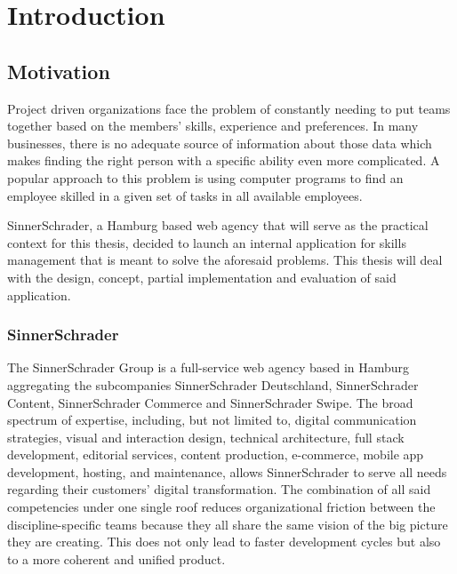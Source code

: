 \chapter{Introduction}

\section{Motivation}
Project driven organizations face the problem of constantly needing to put teams together based on the members’ skills, experience and preferences.
In many businesses, there is no adequate source of information about those data which makes finding the right person with a specific ability even more complicated. A popular approach to this problem is using computer programs to find an employee skilled in a given set of tasks in all available employees.

SinnerSchrader, a Hamburg based web agency that will serve as the practical context for this thesis, decided to launch an internal application for skills management that is meant to solve the aforesaid problems. This thesis will deal with the design, concept, partial implementation and evaluation of said application.



\subsection{SinnerSchrader}

The SinnerSchrader Group is a full-service web agency based in Hamburg aggregating the subcompanies SinnerSchrader Deutschland, SinnerSchrader Content, SinnerSchrader Commerce and SinnerSchrader Swipe. The broad spectrum of expertise, including, but not limited to, digital communication strategies, visual and interaction design,  technical architecture, full stack development, editorial services, content production, e-commerce, mobile app development, hosting, and maintenance, allows SinnerSchrader to serve all needs regarding their customers' digital transformation. The combination of all said competencies under one single roof reduces organizational friction between the discipline-specific teams because they all share the same vision of the big picture they are creating. This does not only lead to faster development cycles but also to a more coherent and unified product.

\newpage

